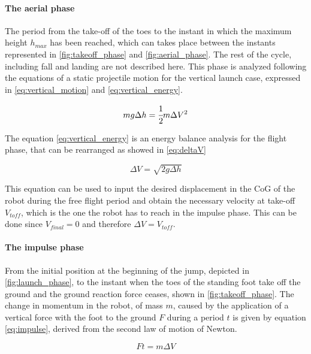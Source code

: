 \paragraph{The aerial phase}
The period from the take-off of the toes to the instant in which the maximum height $h_{max}$ has been reached, which can takes place between the instants represented in \ref{fig:takeoff_phase} and \ref{fig:aerial_phase}. 
The rest of the cycle, including fall and landing are not described here.
This phase is analyzed following the equations of a static projectile motion for the vertical launch case, expressed in \ref{eq:vertical_motion} and \ref{eq:vertical_energy}.


\begin{equation}
\label{eq:vertical_energy}
	m g \Delta h = \cfrac{1}{2} m \Delta V^2
\end{equation}

The equation \ref{eq:vertical_energy} is an energy balance analysis for the flight phase, that can be rearranged as showed in \ref{eq:deltaV}

\begin{equation}
\label{eq:deltaV}
	\Delta V = \sqrt{2 g \Delta h}
\end{equation}

This equation can be used to input the desired displacement in the CoG of the robot during the free flight period and obtain the necessary velocity at take-off $V_{toff}$, which is the one the robot has to reach in the impulse phase.
This can be done since $V_{final} = 0$ and therefore $\Delta V = V_{toff}$.

\paragraph{The impulse phase}
From the initial position at the beginning of the jump, depicted in \ref{fig:launch_phase}, to the instant when the toes of the standing foot take off the ground and the ground reaction force ceases, shown in \ref{fig:takeoff_phase}.
The change in momentum in the robot, of mass $m$, caused by the application of a vertical force with the foot to the ground $F$ during a period $t$ is given by equation \ref{eq:impulse}, derived from the second law of motion of Newton.

\begin{equation}
\label{eq:impulse}
	F  t = m  \Delta V	
\end{equation} 


